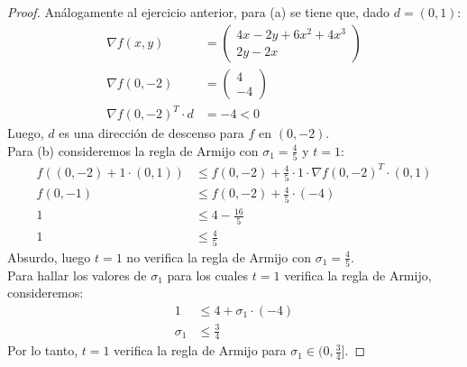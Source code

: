 \documentclass{article}
\begin{document}
\begin{proof}
    Análogamente al ejercicio anterior, para (a) se tiene que, dado \( d = (0, 1) \): \begin{align*}
        \nabla f(x,y)              & = \begin{pmatrix}
                                           4x - 2y + 6x^2 + 4x^3 \\
                                           2y - 2x
                                       \end{pmatrix} \\
        \nabla f(0,-2)             & = \begin{pmatrix}
                                           4 \\
                                           -4
                                       \end{pmatrix}        \\
        {\nabla f(0,-2)}^T \cdot d & = -4 < 0
    \end{align*}
    Luego, \( d \) es una dirección de descenso para \( f \) en \( (0, -2) \). \\
    Para (b) consideremos la regla de Armijo con \( \sigma_ 1 = \frac{4}{5} \) y \( t = 1 \): \begin{align*}
        f((0,-2) + 1 \cdot (0,1)) & \leq f(0, -2) + \frac{4}{5} \cdot 1 \cdot {\nabla f(0,-2)}^T \cdot (0,1) \\
        f(0, -1)                  & \leq f(0, -2) + \frac{4}{5} \cdot (-4)                                   \\
        1                         & \leq 4 - \frac{16}{5}                                                    \\
        1                         & \leq \frac{4}{5}
    \end{align*}
    Absurdo, luego \( t = 1 \) no verifica la regla de Armijo con \( \sigma_1 = \frac{4}{5} \). \\
    Para hallar los valores de \( \sigma_1 \) para los cuales \( t = 1 \) verifica la regla de Armijo, consideremos: \begin{align*}
        1        & \leq 4 + \sigma_1 \cdot (-4) \\
        \sigma_1 & \leq \frac{3}{4}
    \end{align*}
    Por lo tanto, \( t = 1 \) verifica la regla de Armijo para \( \sigma_1 \in (0, \frac{3}{4}] \).
\end{proof}

\vspace{0.25in}
\end{document}
